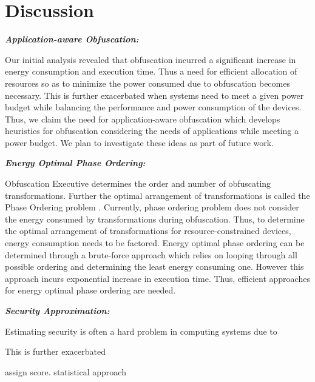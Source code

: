 
\section{Discussion}

\emph{\textbf{Application-aware Obfuscation:}}

Our initial analysis revealed that obfuscation incurred a significant increase in energy consumption and execution time. Thus a need for efficient allocation of resources so as to minimize the power consumed due to obfuscation becomes necessary. This is further exacerbated when systems need to meet a given power budget while balancing the performance and power consumption of the devices. Thus, we claim the need for application-aware obfuscation which develops heuristics for obfuscation considering the needs of applications while meeting a power budget. We plan to investigate these ideas as part of future work.  

\emph{\textbf{Energy Optimal Phase Ordering:}}

Obfuscation Executive \cite{heffner} determines the order and number of obfuscating transformations. Further the optimal arrangement of transformations is called the Phase Ordering problem \cite{holder}. Currently, phase ordering problem does not consider the energy consumed by transformations during obfuscation. Thus, to determine the optimal arrangement of transformations for resource-constrained devices, energy consumption needs to be factored. Energy optimal phase ordering can be determined through a brute-force approach which relies on looping through all possible ordering and determining the least energy consuming one. However this approach incurs exponential increase in execution time. Thus, efficient approaches for energy optimal phase ordering are needed.       

\emph{\textbf{Security Approximation:}}

Estimating security is often a hard problem in computing systems due to 

This is further exacerbated  

assign score. 
statistical approach 
